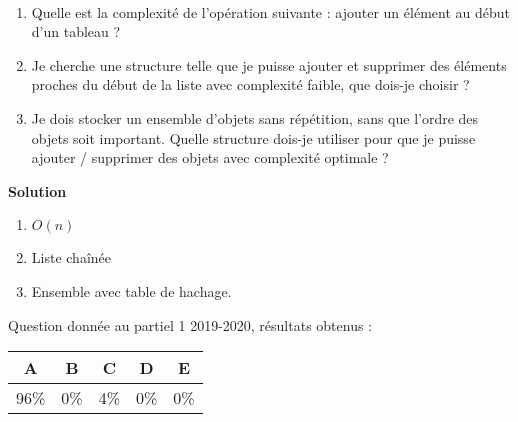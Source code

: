 \begin{exercice}[2019 -- 2020]~

\begin{enumerate}
\item Quelle est la complexité de l'opération suivante : ajouter un élément au début d'un tableau ?
\item Je cherche une structure telle que je puisse ajouter et supprimer des éléments proches du début de la liste avec complexité faible, que dois-je choisir ?
\item Je dois stocker un ensemble d'objets sans répétition, sans que l'ordre des objets soit important. Quelle structure dois-je utiliser pour que je puisse ajouter / supprimer des objets avec complexité optimale ?
\end{enumerate}

\textbf{Solution}

\begin{enumerate}
\item $O(n)$

\item Liste chaînée
\item Ensemble avec table de hachage. 
\end{enumerate}

Question donnée au partiel 1 2019-2020, résultats obtenus :

\begin{tabular}{|c|c|c|c|c|}
\hline
A & B & C & D & E \\ \hline
96\% & 0\% & 4\% & 0\% & 0\% \\ \hline
\end{tabular} 





\end{exercice}